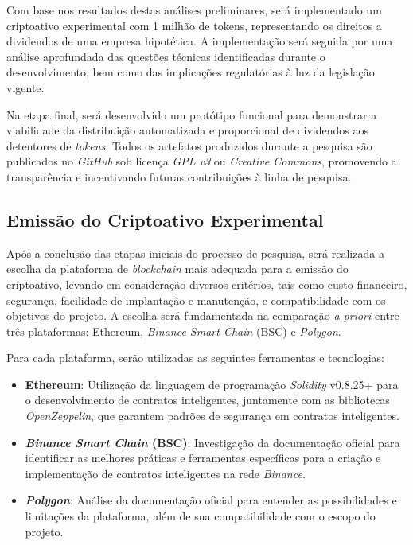 \documentclass[12pt, a4paper, oneside, openright, chapter=TITLE]{abntex2}
\begin{document}
Com base nos resultados destas análises preliminares, será implementado um criptoativo experimental com 1 milhão de tokens, representando os direitos a dividendos de uma empresa hipotética. A implementação será seguida por uma análise aprofundada das questões técnicas identificadas durante o desenvolvimento, bem como das implicações regulatórias à luz da legislação vigente.

Na etapa final, será desenvolvido um protótipo funcional para demonstrar a viabilidade da distribuição automatizada e proporcional de dividendos aos detentores de \textit{tokens}. Todos os artefatos produzidos durante a pesquisa são publicados no \textit{GitHub} sob licença \textit{GPL v3} ou \textit{Creative Commons}, promovendo a transparência e incentivando futuras contribuições à linha de pesquisa.

\subsection{Emissão do Criptoativo Experimental}

\hspace*{\parindent} Após a conclusão das etapas iniciais do processo de pesquisa, será realizada a escolha da plataforma de \textit{blockchain} mais adequada para a emissão do criptoativo, levando em consideração diversos critérios, tais como custo financeiro, segurança, facilidade de implantação e manutenção, e compatibilidade com os objetivos do projeto. A escolha será fundamentada na comparação \textit{a priori} entre três plataformas: Ethereum, \textit{Binance Smart Chain} (BSC) e \textit{Polygon}.

Para cada plataforma, serão utilizadas as seguintes ferramentas e tecnologias:

\begin{itemize}
    \item \textbf{Ethereum}: Utilização da linguagem de programação \textit{Solidity} v0.8.25+ para o desenvolvimento de contratos inteligentes, juntamente com as bibliotecas \textit{OpenZeppelin}, que garantem padrões de segurança em contratos inteligentes.
    \item \textbf{\textit{Binance Smart Chain} (BSC)}: Investigação da documentação oficial para identificar as melhores práticas e ferramentas específicas para a criação e implementação de contratos inteligentes na rede \textit{Binance}.
    \item \textbf{\textit{Polygon}}: Análise da documentação oficial para entender as possibilidades e limitações da plataforma, além de sua compatibilidade com o escopo do projeto.
\end{itemize}
\end{document}
